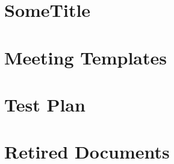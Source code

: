 \documentclass{article}
\begin{document}
\renewcommand{\thepage}{\roman{page}}




\newpage
\setcounter{page}{1}
\renewcommand{\thepage}{\arabic{page}}

\newpage


\newpage


\newpage


\newpage


\newpage


\newpage


\newpage


\newpage



\newpage


\appendix

\newpage
\section{SomeTitle}



\newpage


\newpage
\section{Meeting Templates}

\newpage



\newpage
\section{Test Plan}

\newpage


\newpage
\section{Retired Documents}

\newpage


\newpage


\newpage

\end{document}

